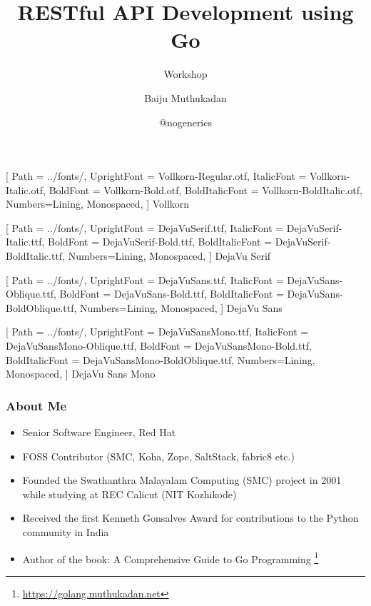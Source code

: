 \documentclass[aspectratio=169]{beamer}
\title{RESTful API Development using Go}
\subtitle{Workshop}
\author{Baiju Muthukadan}
\institute{Red Hat}
\date{@nogenerics}
\begin{document}
\beamertemplatenavigationsymbolsempty

\setmainfont
[ Path = ../fonts/,
UprightFont = DejaVuSerif.ttf,
ItalicFont = DejaVuSerif-Italic.ttf,
BoldFont = DejaVuSerif-Bold.ttf,
BoldItalicFont = DejaVuSerif-BoldItalic.ttf,
Numbers={Lining, Monospaced},
] {DejaVu Serif}

\setsansfont
[ Path = ../fonts/,
UprightFont = DejaVuSans.ttf,
ItalicFont = DejaVuSans-Oblique.ttf,
BoldFont = DejaVuSans-Bold.ttf,
BoldItalicFont = DejaVuSans-BoldOblique.ttf,
Numbers={Lining, Monospaced},
] {DejaVu Sans}

\setmonofont
[ Path = ../fonts/,
UprightFont = DejaVuSansMono.ttf,
ItalicFont = DejaVuSansMono-Oblique.ttf,
BoldFont = DejaVuSansMono-Bold.ttf,
BoldItalicFont = DejaVuSansMono-BoldOblique.ttf,
Numbers={Lining, Monospaced},
] {DejaVu Sans Mono}


\newfontfamily{\vollkorn}
[ Path = ../fonts/,
UprightFont = Vollkorn-Regular.otf,
ItalicFont = Vollkorn-Italic.otf,
BoldFont = Vollkorn-Bold.otf,
BoldItalicFont = Vollkorn-BoldItalic.otf,
Numbers={Lining, Monospaced},
] {Vollkorn}

\newfontfamily{\dejavuserif}
[ Path = ../fonts/,
UprightFont = DejaVuSerif.ttf,
ItalicFont = DejaVuSerif-Italic.ttf,
BoldFont = DejaVuSerif-Bold.ttf,
BoldItalicFont = DejaVuSerif-BoldItalic.ttf,
Numbers={Lining, Monospaced},
] {DejaVu Serif}

\newfontfamily{\dejavusans}
[ Path = ../fonts/,
UprightFont = DejaVuSans.ttf,
ItalicFont = DejaVuSans-Oblique.ttf,
BoldFont = DejaVuSans-Bold.ttf,
BoldItalicFont = DejaVuSans-BoldOblique.ttf,
Numbers={Lining, Monospaced},
] {DejaVu Sans}

\newfontfamily{\dejavumono}
[ Path = ../fonts/,
UprightFont = DejaVuSansMono.ttf,
ItalicFont = DejaVuSansMono-Oblique.ttf,
BoldFont = DejaVuSansMono-Bold.ttf,
BoldItalicFont = DejaVuSansMono-BoldOblique.ttf,
Numbers={Lining, Monospaced},
] {DejaVu Sans Mono}

\frame{\titlepage}

\begin{frame}
  \frametitle{About Me}

  \begin{itemize}
  \item<1-> Senior Software Engineer, Red Hat
  \item<2-> FOSS Contributor (SMC, Koha, Zope, SaltStack, fabric8 etc.)
  \item<3-> Founded the Swathanthra Malayalam Computing (SMC) project in 2001 while studying at REC Calicut (NIT Kozhikode)
  \item<4-> Received the first Kenneth Gonsalves Award for contributions to the Python community in India
  \item<5-> Author of the book: A Comprehensive Guide to Go Programming \footnote{\url{https://golang.muthukadan.net}}
  \end{itemize}

\end{frame}
\end{document}
